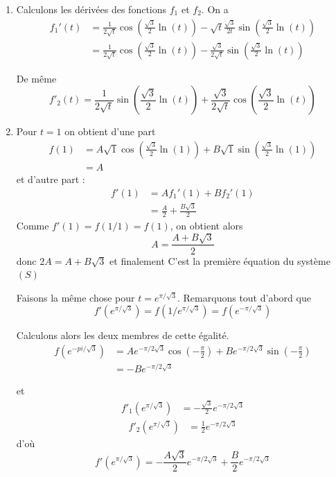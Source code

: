 \begin{correction}
\begin{enumerate}
\item Calculons les dérivées des fonctions $f_1$ et $f_2$. 
On a 
\begin{align*}
f_1'(t) &= \frac{1}{2\sqrt{t}}  \cos\left(\frac{\sqrt{3}}{2}\ln(t)\right)  - \sqrt{t} \frac{\sqrt{3}}{2t} \sin\left(\frac{\sqrt{3}}{2}\ln(t)\right)\\
&= \frac{1}{2\sqrt{t}}  \cos\left(\frac{\sqrt{3}}{2}\ln(t)\right)  - \frac{\sqrt{3}}{2\sqrt{t} } \sin\left(\frac{\sqrt{3}}{2}\ln(t)\right)
\end{align*}

De même 
$$f'_2(t)= \frac{1}{2\sqrt{t}}  \sin\left(\frac{\sqrt{3}}{2}\ln(t)\right)  + \frac{\sqrt{3}}{2\sqrt{t} } \cos\left(\frac{\sqrt{3}}{2}\ln(t)\right)$$

\item Pour $t= 1$ on obtient d'une part 
\begin{align*}
f(1)& = A \sqrt{1}  \cos\left(\frac{\sqrt{3}}{2}\ln(1)\right) +B\sqrt{1}  \sin\left(\frac{\sqrt{3}}{2}\ln(1)\right)\\
&=A
\end{align*}
et  d'autre part : 
\begin{align*}
f'(1) &= Af_1'(1) +  Bf_2'(1)\\
		&= \frac{A}{2} + \frac{B\sqrt{3}}{2}
\end{align*}
Comme $f'(1) =f(1/1)=f(1)$,
on obtient alors 
$$A= \frac{A+B\sqrt{3}}{2}$$
donc 
$2A=A+B\sqrt{3} $ et finalement 
C'est la première équation du système $(S)$


Faisons la même chose pour $t=e^{\pi/\sqrt{3}}$. Remarquons tout d'abord que 
$$f'(e^{\pi/\sqrt{3}}) = f(1/e^{\pi/\sqrt{3}}) = f(e^{-\pi/\sqrt{3}})$$

Calculons alors les deux membres de cette égalité. 
\begin{align*}
f(e^{-pi/\sqrt{3}}) &=Ae^{-\pi/2\sqrt{3}}  \cos( -\frac{\pi}{2})+Be^{-\pi/2\sqrt{3}}  \sin( -\frac{\pi}{2})\\
&=-B e^{-\pi/2\sqrt{3}} 
\end{align*}

et
\begin{align*}
 f'_1(e^{\pi/\sqrt{3}})&= -\frac{\sqrt{3}}{2}e^{-\pi/2\sqrt{3}}
\end{align*}
\begin{align*}
 f'_2(e^{\pi/\sqrt{3}})&= \frac{1}{2}e^{-\pi/2\sqrt{3}}
\end{align*}
d'où 
$$f'(e^{\pi/\sqrt{3}}) =  -\frac{A\sqrt{3}}{2}e^{-\pi/2\sqrt{3}}+ \frac{B}{2}e^{-\pi/2\sqrt{3}}$$


\end{enumerate}
\end{correction}
